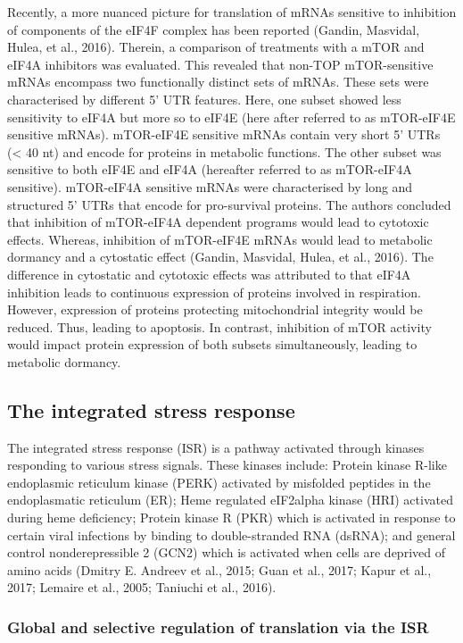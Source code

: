 \documentclass[
  12pt,
  openany]{book}
\begin{document}
Recently, a more nuanced picture for translation of mRNAs sensitive to inhibition of components of the eIF4F complex has been reported (Gandin, Masvidal, Hulea, et al., 2016). Therein, a comparison of treatments with a mTOR and eIF4A inhibitors was evaluated. This revealed that non-TOP mTOR-sensitive mRNAs encompass two functionally distinct sets of mRNAs. These sets were characterised by different 5' UTR features. Here, one subset showed less sensitivity to eIF4A but more so to eIF4E (here after referred to as mTOR-eIF4E sensitive mRNAs). mTOR-eIF4E sensitive mRNAs contain very short 5' UTRs (\textless{} 40 nt) and encode for proteins in metabolic functions. The other subset was sensitive to both eIF4E and eIF4A (hereafter referred to as mTOR-eIF4A sensitive). mTOR-eIF4A sensitive mRNAs were characterised by long and structured 5' UTRs that encode for pro-survival proteins. The authors concluded that inhibition of mTOR-eIF4A dependent programs would lead to cytotoxic effects. Whereas, inhibition of mTOR-eIF4E mRNAs would lead to metabolic dormancy and a cytostatic effect (Gandin, Masvidal, Hulea, et al., 2016). The difference in cytostatic and cytotoxic effects was attributed to that eIF4A inhibition leads to continuous expression of proteins involved in respiration. However, expression of proteins protecting mitochondrial integrity would be reduced. Thus, leading to apoptosis. In contrast, inhibition of mTOR activity would impact protein expression of both subsets simultaneously, leading to metabolic dormancy.

\subsection{The integrated stress response}

The integrated stress response (ISR) is a pathway activated through kinases responding to various stress signals. These kinases include: Protein kinase R-like endoplasmic reticulum kinase (PERK) activated by misfolded peptides in the endoplasmatic reticulum (ER); Heme regulated eIF2alpha kinase (HRI) activated during heme deficiency; Protein kinase R (PKR) which is activated in response to certain viral infections by binding to double-stranded RNA (dsRNA); and general control nonderepressible 2 (GCN2) which is activated when cells are deprived of amino acids (Dmitry E. Andreev et al., 2015; Guan et al., 2017; Kapur et al., 2017; Lemaire et al., 2005; Taniuchi et al., 2016).

\subsubsection{Global and selective regulation of translation via the ISR}
\end{document}
